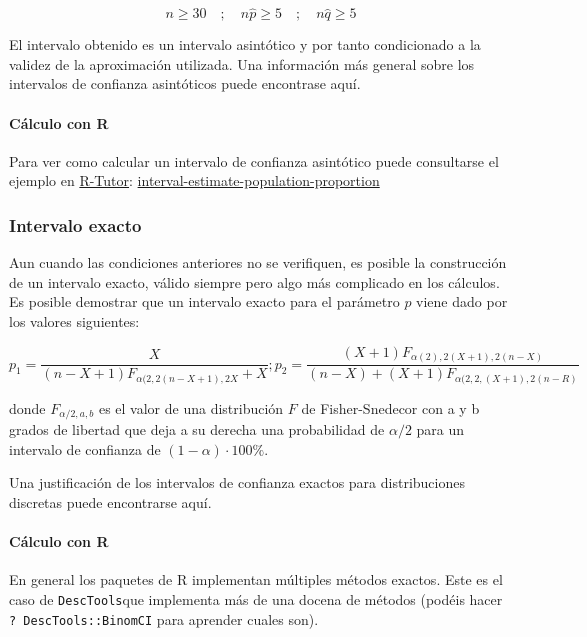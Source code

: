 \documentclass[
]{article}
\begin{document}
\[
n \geq 30 \quad ; \quad n \hat{p} \geq 5 \quad ; \quad n \hat{q} \geq 5
\]

El intervalo obtenido es un intervalo asintótico y por tanto condicionado a la validez de la aproximación utilizada. Una información más general sobre los intervalos de confianza asintóticos puede encontrase aquí.

\paragraph{Cálculo con R}\label{cuxe1lculo-con-r}

Para ver como calcular un intervalo de confianza asintótico puede consultarse el ejemplo en \href{r-tutor.com}{R-Tutor}: \href{https://www.r-tutor.com/elementary-statistics/interval-estimation/interval-estimate-population-proportion}{interval-estimate-population-proportion}

\subsubsection{Intervalo exacto}\label{intervalo-exacto}

Aun cuando las condiciones anteriores no se verifiquen, es posible la construcción de un intervalo exacto, válido siempre pero algo más complicado en los cálculos. Es posible demostrar que un intervalo exacto para el parámetro \(p\) viene dado por los valores siguientes:

\[
p_{1}=\frac{X}{(n-X+1) F_{\alpha(2,2(n-X+1), 2 X}+X} ; p_{2}=\frac{(X+1) F_{\alpha(2), 2(X+1), 2(n-X)}}{(n-X)+(X+1) F_{\alpha(2,2,(X+1), 2(n-R)}}
\]

donde \(F_{\alpha / 2, a, b}\) es el valor de una distribución \(F\) de Fisher-Snedecor con a y b grados de libertad que deja a su derecha una probabilidad de \(\alpha / 2\) para un intervalo de confianza de \((1-\alpha) \cdot 100 \%\).

Una justificación de los intervalos de confianza exactos para distribuciones discretas puede encontrarse aquí.

\paragraph{Cálculo con R}\label{cuxe1lculo-con-r-1}

En general los paquetes de R implementan múltiples métodos exactos. Este es el caso de \texttt{DescTools}que implementa más de una docena de métodos (podéis hacer \texttt{?\ DescTools::BinomCI} para aprender cuales son).
\end{document}
